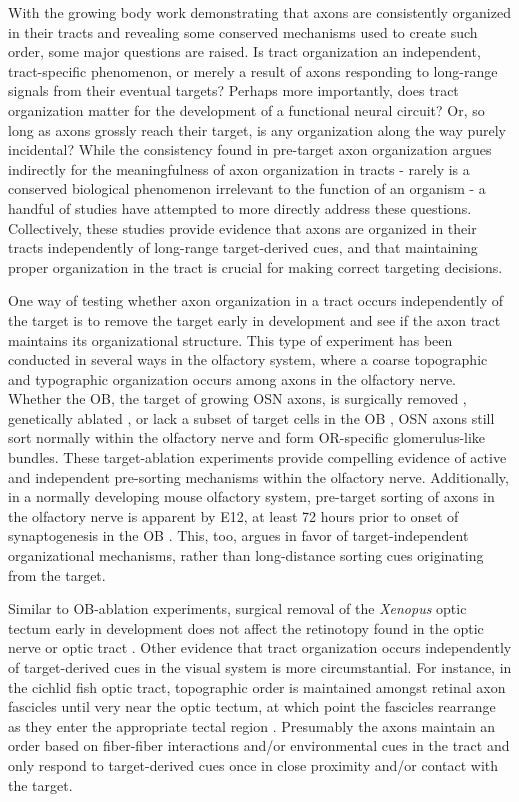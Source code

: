 \label{sec:TractOrderIndependOfTargeting}
With the growing body work demonstrating that axons are consistently organized in their tracts and revealing some conserved mechanisms used to create such order, some major questions are raised.
Is tract organization an independent, tract-specific phenomenon, or merely a result of axons responding to long-range signals from their eventual targets?
Perhaps more importantly, does tract organization matter for the development of a functional neural circuit?
Or, so long as axons grossly reach their target, is any organization along the way purely incidental?
While the consistency found in pre-target axon organization argues indirectly for the meaningfulness of axon organization in tracts - rarely is a conserved biological phenomenon irrelevant to the function of an organism - a handful of studies have attempted to more directly address these questions.
Collectively, these studies provide evidence that axons are organized in their tracts independently of long-range target-derived cues, and that maintaining proper organization in the tract is crucial for making correct targeting decisions.

One way of testing whether axon organization in a tract occurs independently of the target is to remove the target early in development and see if the axon tract maintains its organizational structure.
This type of experiment has been conducted in several ways in the olfactory system, where a coarse topographic and typographic organization occurs among axons in the olfactory nerve.
Whether the OB, the target of growing OSN axons, is surgically removed \cite{graziadei1978regeneration}, genetically ablated \cite{stjohn2003sorting}, or lack a subset of target cells in the OB \cite{bulfone1998olfactory}, OSN axons still sort normally within the olfactory nerve and form OR-specific glomerulus-like bundles.
These target-ablation experiments provide compelling evidence of active and independent pre-sorting mechanisms within the olfactory nerve.
Additionally, in a normally developing mouse olfactory system, pre-target sorting of axons in the olfactory nerve is apparent by E12, at least 72 hours prior to onset of synaptogenesis in the OB \cite{miller2010axon}.
This, too, argues in favor of target-independent organizational mechanisms, rather than long-distance sorting cues originating from the target.

Similar to OB-ablation experiments, surgical removal of the \emph{Xenopus} optic tectum early in development does not affect the retinotopy found in the optic nerve or optic tract \cite{reh1983organization}.
Other evidence that tract organization occurs independently of target-derived cues in the visual system is more circumstantial.
For instance, in the cichlid fish optic tract, topographic order is maintained amongst retinal axon fascicles until very near the optic tectum, at which point the fascicles rearrange as they enter the appropriate tectal region \cite{scholes1979nerve}.
Presumably the axons maintain an order based on fiber-fiber interactions and/or environmental cues in the tract and only respond to target-derived cues once in close proximity and/or contact with the target.

